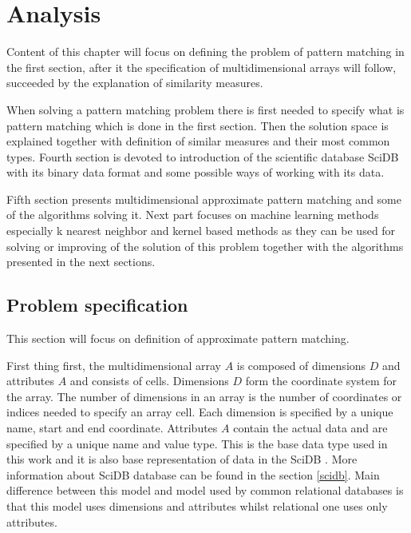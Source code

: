 \chapter{Analysis}
Content of this chapter will focus on defining the problem of pattern matching in the first section, after it the specification of multidimensional arrays will follow, succeeded by the explanation of similarity measures. 

When solving a pattern matching problem there is first needed to specify what is pattern matching which is done in the first section. Then the solution space is explained together with definition of similar measures and their most common types. Fourth section is devoted to introduction of the scientific database SciDB with its binary data format and some possible ways of working with its data.

Fifth section presents multidimensional approximate pattern matching and some of the algorithms solving it. Next part focuses on machine learning methods especially k nearest neighbor and kernel based methods as they can be used for solving or improving of the solution of this problem together with the algorithms presented in the next sections.
\section{Problem specification} \label{spec}
This section will focus on definition of approximate pattern matching. 

First thing first,
the multidimensional array $A$ is composed of dimensions $D$ and attributes $A$ and consists of cells. Dimensions $D$ form the coordinate system for the array. The number of dimensions in an array is the number of coordinates or indices needed to specify an array cell. Each dimension is specified by a unique name, start and end coordinate. Attributes $A$ contain the actual data and are specified by a unique name and value type. This is the base data type used in this work and it is also base representation of data in the SciDB \cite{scidb}. More information about SciDB database can be found in the section \ref{scidb}. Main difference between this model and model used by common relational databases is that this model uses dimensions and attributes whilst relational one uses only attributes.

